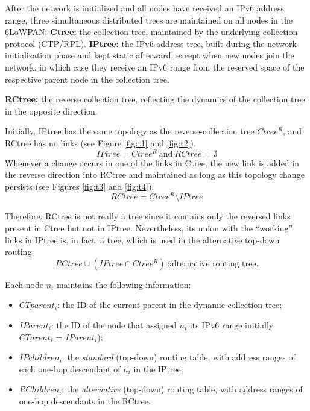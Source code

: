 After the network is initialized and all nodes have received an IPv6 address range, three simultaneous distributed trees are maintained on all nodes in the 6LoWPAN: \textbf{Ctree:} the collection tree, maintained by the underlying collection protocol (CTP/RPL). \textbf{IPtree:} the IPv6 address tree, built during the network initialization phase and kept static afterward, except when new nodes join the network, in which case they receive an IPv6 range from the reserved space of the respective parent node in the collection tree.

\textbf{RCtree:} the reverse collection tree, reflecting the dynamics of the collection tree in the opposite direction.

Initially, IPtree has the same topology as the reverse-collection tree $Ctree^{R}$, and RCtree has no links (see Figure \ref{fig:t1} and \ref{fig:t2}).
$$
IPtree = Ctree^{R} \ \text{and} \ RCtree = \emptyset
$$
Whenever a change occurs in one of the links in Ctree, the new link is added in the reverse direction into RCtree and maintained as long as this topology change persists (see Figures \ref{fig:t3} and \ref{fig:t4}).
$$
RCtree = Ctree^{R} \setminus IPtree
$$

Therefore, RCtree is not really a tree since it contains only the reversed links present in Ctree but not in IPtree. Nevertheless, its union with the ``working'' links in IPtree is, in fact, a tree, which is used in the alternative top-down routing:
$$
RCtree \cup (IPtree \cap Ctree^{R}) \  \text{:alternative routing tree.}
$$



Each node $n_i$ maintains the following information:
\begin{itemize}
  \item $CTparent_i$: the ID of the current parent in the dynamic collection tree;

  \item $IParent_i$: the ID of the node that assigned $n_i$ its IPv6 range initially $CTarent_i$ = $IParent_i$);

  \item $IPchildren_i$: the \textit{standard} (top-down) routing table, with address ranges of each one-hop descendant of $n_i$ in the IPtree;

  \item $RChildren_i$: the \textit{alternative} (top-down) routing table, with address ranges of one-hop descendants in the RCtree.
\end{itemize}

